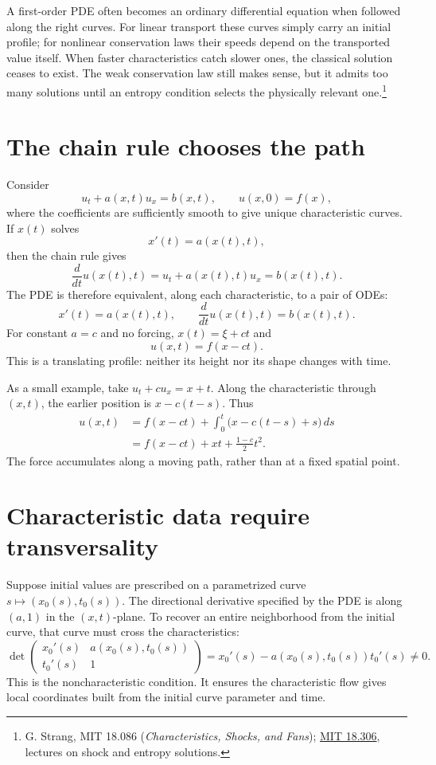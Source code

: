 
A first-order PDE often becomes an ordinary differential equation when followed along the right curves. For linear transport these curves simply carry an initial profile; for nonlinear conservation laws their speeds depend on the transported value itself. When faster characteristics catch slower ones, the classical solution ceases to exist. The weak conservation law still makes sense, but it admits too many solutions until an entropy condition selects the physically relevant one.\footnote{G. Strang, MIT 18.086 (\emph{Characteristics, Shocks, and Fans}); \href{https://ocw.mit.edu/courses/18-306-advanced-partial-differential-equations-with-applications-fall-2009/pages/lecture-notes/}{MIT 18.306}, lectures on shock and entropy solutions.}

\section{The chain rule chooses the path}

Consider
\[
 u_t+a(x,t)u_x=b(x,t),\qquad u(x,0)=f(x),
\]
where the coefficients are sufficiently smooth to give unique characteristic curves. If \(x(t)\) solves
\[
 x'(t)=a(x(t),t),
\]
then the chain rule gives
\[
 \frac d{dt}u(x(t),t)
 =u_t+a(x(t),t)u_x=b(x(t),t).
\]
The PDE is therefore equivalent, along each characteristic, to a pair of ODEs:
\[
 x'(t)=a(x(t),t),\qquad
 \frac d{dt}u(x(t),t)=b(x(t),t).
\]
For constant \(a=c\) and no forcing, \(x(t)=\xi+ct\) and
\[
 \boxed{u(x,t)=f(x-ct).}
\]
This is a translating profile: neither its height nor its shape changes with time.

As a small example, take \(u_t+cu_x=x+t\). Along the characteristic through \((x,t)\), the earlier position is \(x-c(t-s)\). Thus
\[
\begin{aligned}
 u(x,t)
 &=f(x-ct)+\int_0^t\bigl(x-c(t-s)+s\bigr)\,ds\\
 &=\boxed{f(x-ct)+xt+\frac{1-c}{2}t^2}.
\end{aligned}
\]
The force accumulates along a moving path, rather than at a fixed spatial point.

\section{Characteristic data require transversality}

Suppose initial values are prescribed on a parametrized curve \(s\mapsto(x_0(s),t_0(s))\). The directional derivative specified by the PDE is along \((a,1)\) in the \((x,t)\)-plane. To recover an entire neighborhood from the initial curve, that curve must cross the characteristics:
\[
 \det\begin{pmatrix}x_0'(s)&a(x_0(s),t_0(s))\\
 t_0'(s)&1\end{pmatrix}
 =x_0'(s)-a(x_0(s),t_0(s))t_0'(s)\ne0.
\]
This is the noncharacteristic condition. It ensures the characteristic flow gives local coordinates built from the initial curve parameter and time.

